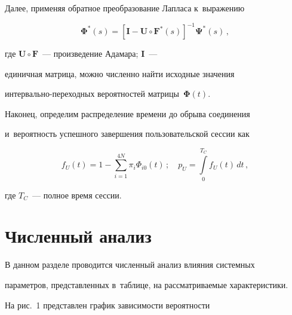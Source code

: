   


  Далее, применяя обратное преобразование Лап\-ла\-са к~выражению


  \begin{equation*}


  \boldsymbol{\Phi}^*(s)=\left[ \mathbf{I}-\mathbf{U}\circ 


\mathbf{F}^*(s)\right]^{-1}\boldsymbol{\Psi}^*(s)\,,




  \end{equation*}


где $\mathbf{U}\circ \mathbf{F}$~--- произведение Адамара; $\mathbf{I}$~--- 


единичная мат\-ри\-ца, мож\-но чис\-лен\-но найти исходные значения  


ин\-тер\-валь\-но-пе\-ре\-ход\-ных вероятностей мат\-ри\-цы~$\boldsymbol{\Phi}(t)$.


  


  Наконец, определим распределение времени до обрыва соединения 


и~ве\-ро\-ят\-ность успешного завершения пользовательской сессии как


  \begin{equation*}


  f_U(t)= 1-\sum\limits^{4N}_{i=1} \pi_i \Phi_{i0}(t)\,;\quad p_U=\int\limits_0^{T_C} 


f_U(t)\,dt\,,




  \end{equation*}


где $T_C$~--- полное время сессии. 





\section{Численный анализ}


  


  В данном разделе проводится численный анализ влияния сис\-тем\-ных 


па\-ра\-мет\-ров, пред\-став\-лен\-ных в~таб\-ли\-це, на рас\-смат\-ри\-ва\-емые характеристики. 


  


  На рис.~1 представлен график за\-ви\-си\-мости вероятности 


